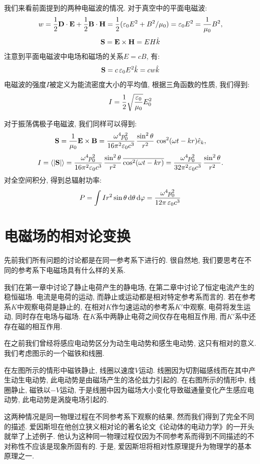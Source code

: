 我们来看前面提到的两种电磁波的情况. 对于真空中的平面电磁波:
\[
w = \frac{1}{2}\mathbf{D}\cdot\mathbf{E}+\frac{1}{2}\mathbf{B}\cdot\mathbf{H} = \frac{1}{2}(\mathop{}\!\varepsilon_0E^2+B^2/\mu_0) = \mathop{}\!\varepsilon_0E^2 = \frac{1}{\mu_0}B^2,
\]
\[
\mathbf{S} = \mathbf{E} \times \mathbf{H} = EH\hat{k}
\]
注意到平面电磁波中电场和磁场的关系$E = cB$, 有:
\[
\mathbf{S} = c\mathop{}\!\varepsilon_0E^2\hat{k} = cw\hat{k}
\]
电磁波的强度$I$被定义为能流密度大小的平均值, 根据三角函数的性质, 我们得到:
\[
I = \frac{1}{2}\sqrt{\frac{\mathop{}\!\varepsilon_0}{\mu_0}}E_0^2
\]

对于振荡偶极子电磁波, 我们同样可以得到:
\[
\mathbf{S} =\frac{1}{\mu_0} \mathbf{E}\times\mathbf{B} = \frac{\omega^4 p_0^2}{16\pi^2\varepsilon_0c^3}\,
\frac{\sin^2\theta}{r^2}\,
\cos^2(\omega t - kr)\hat{e}_k,
\]
\[
I = \langle|\mathbf{S}|\rangle = \frac{\omega^4 p_0^2}{16\pi^2\varepsilon_0c^3}\,
\frac{\sin^2\theta}{r^2}\,
\overline{\cos^2(\omega t - kr)} = \frac{\omega^4 p_0^2}{32\pi^2\varepsilon_0c^3}\,
\frac{\sin^2\theta}{r^2}.
\]
对全空间积分, 得到总辐射功率:
\[
P = \int I r^2\sin\theta\mathop{}\!\mathrm{d}\theta\mathop{}\!\mathrm{d}\varphi = \frac{\omega^4p_0^2}{12\pi\mathop{}\!\varepsilon_0c^3}
\]

\section{电磁场的相对论变换}
先前我们所有问题的讨论都是在同一参考系下进行的. 很自然地, 我们要思考在不同的参考系下电磁场具有什么样的关系.

我们在第一章中讨论了静止电荷产生的静电场, 在第二章中讨论了恒定电流产生的稳恒磁场. 电流是电荷的运动, 而静止或运动都是相对特定参考系而言的. 若在参考系$K$中观察电荷是静止的, 在相对$K$作匀速运动的参考系$K'$中观察, 电荷将发生运动, 同时存在电场与磁场. 在$K$系中两静止电荷之间仅存在电相互作用, 而$K'$系中还存在磁的相互作用.

在之前我们曾经将感应电动势区分为动生电动势和感生电动势, 这只有相对的意义. 我们考虑图示的一个磁铁和线圈.


在左图所示的情形中磁铁静止, 线圈以速度$V$运动. 线圈因为切割磁感线而在其中产生动生电动势, 此电动势是由磁场产生的洛伦兹力引起的. 在右图所示的情形中, 线圈静止, 磁铁以$-V$运动, 于是线圈中因为磁场大小变化导致磁通量变化产生感应电动势, 此电动势是涡旋电场引起的.

这两种情况是同一物理过程在不同参考系下观察的结果, 然而我们得到了完全不同的描述. 爱因斯坦在他创立狭义相对论的著名论文《论动体的电动力学》的一开头就举了上述例子. 他认为这种同一物理过程仅因为不同参考系而得到不同描述的不对称性不应该是现象所固有的. 于是, 爱因斯坦将相对性原理提升为物理学的基本原理之一.

